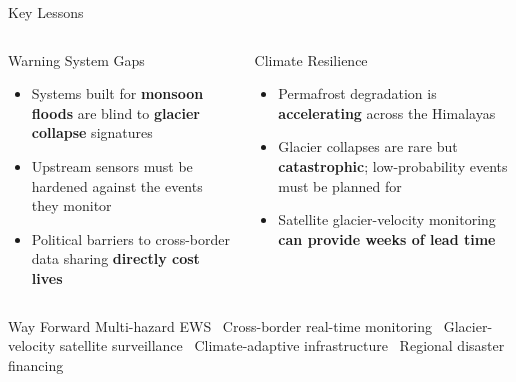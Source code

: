 \documentclass[aspectratio=169, 12pt]{beamer}
\begin{document}
	\begin{frame}{Key Lessons}
		\begin{columns}[T]
			\begin{block}{Warning System Gaps}
				\begin{itemize}
					\item Systems built for \textbf{monsoon floods} are blind
					to \textbf{glacier collapse} signatures
					\item Upstream sensors must be hardened against
					the events they monitor
					\item Political barriers to cross-border data sharing
					\textbf{directly cost lives}
				\end{itemize}
			\end{block}
			
			\begin{block}{Climate Resilience}
				\begin{itemize}
					\item Permafrost degradation is
					\textbf{accelerating} across the Himalayas
					\item Glacier collapses are rare but
					\textbf{catastrophic}; low-probability events
					must be planned for
					\item Satellite glacier-velocity monitoring
					\textbf{can provide weeks of lead time}
				\end{itemize}
			\end{block}
		\end{columns}
		
		\vspace{8pt}
		\begin{exampleblock}{Way Forward}
			\centering
			Multi-hazard EWS \textbullet\
			Cross-border real-time monitoring \textbullet\
			Glacier-velocity satellite surveillance \textbullet\
			Climate-adaptive infrastructure \textbullet\
			Regional disaster financing
		\end{exampleblock}
	\end{frame}
	
\end{document}
